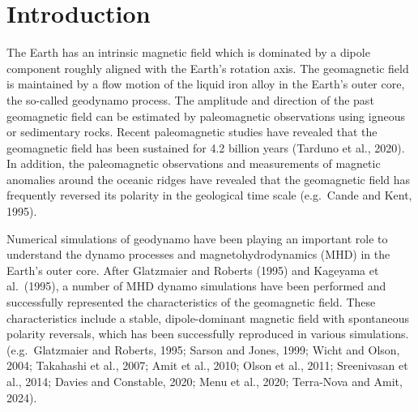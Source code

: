 \newpage
\section{Introduction}
\label{section:introduction}
The Earth has an intrinsic magnetic field which is dominated by a dipole component roughly aligned with the Earth's rotation axis. 
The geomagnetic field is maintained by a flow motion of the liquid iron alloy in the Earth's outer core, the so-called geodynamo process.
The amplitude and direction of the past geomagnetic field can be estimated by paleomagnetic observations using igneous or sedimentary rocks.
Recent paleomagnetic studies have revealed that the geomagnetic field has been sustained for 4.2 billion years (Tarduno et al., 2020). %
In addition, the paleomagnetic observations and measurements of magnetic anomalies around the oceanic ridges have revealed that 
the geomagnetic field has frequently reversed its polarity in the geological time scale (e.g.\ Cande and Kent, 1995).

Numerical simulations of geodynamo have been playing an important role to understand the dynamo processes and magnetohydrodynamics (MHD) in the Earth's outer core.
After Glatzmaier and Roberts (1995) %
and Kageyama et al.\ (1995), %
a number of MHD dynamo simulations have been performed and successfully represented the characteristics of the geomagnetic field.
These characteristics include a stable, dipole-dominant magnetic field with spontaneous polarity reversals, which has been successfully reproduced in various simulations. (e.g.\ Glatzmaier and Roberts, 1995; 
Sarson and Jones, 1999;
Wicht and Olson, 2004;
Takahashi et al., 2007; 
Amit et al., 2010; 
Olson et al., 2011; 
Sreenivasan et al., 2014;
Davies and Constable, 2020;
Menu et al., 2020;
Terra-Nova and Amit, 2024).

